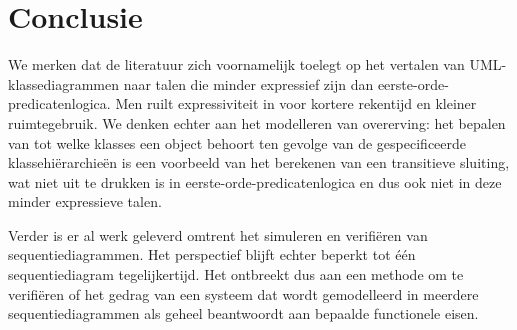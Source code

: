 \section{Conclusie}

\sloppy We merken dat de literatuur zich voornamelijk toelegt op het vertalen van UML-klassediagrammen naar talen die minder expressief zijn dan eerste-orde-predicatenlogica. Men ruilt expressiviteit in voor kortere rekentijd en kleiner ruimtegebruik. We denken echter aan het modelleren van overerving: het bepalen van tot welke klasses een object behoort ten gevolge van de gespecificeerde klassehi\"erarchie\"en is een voorbeeld van het berekenen van een transitieve sluiting, wat niet uit te drukken is in eerste-orde-predicatenlogica en dus ook niet in deze minder expressieve talen.

Verder is er al werk geleverd omtrent het simuleren en verifi\"eren van sequentiediagrammen. Het perspectief blijft echter beperkt tot \'e\'en sequentiediagram tegelijkertijd. Het ontbreekt dus aan een methode om te verifi\"eren of het gedrag van een systeem dat wordt gemodelleerd in meerdere sequentiediagrammen als geheel beantwoordt aan bepaalde functionele eisen.